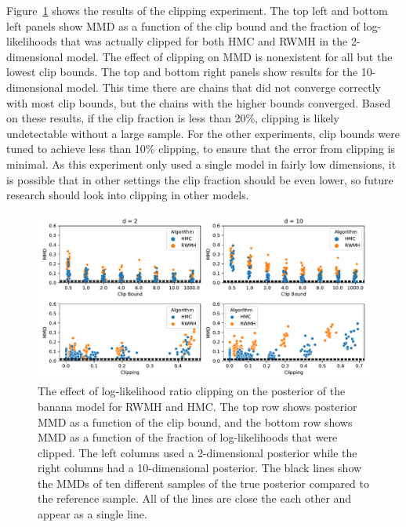 \documentclass[english,twoside,openright]{HYgraduMLDS}
\begin{document}
Figure~\ref{clip_effect_fig} shows the results of the clipping experiment.
The top left and bottom left panels show MMD as a function of the clip bound 
and the fraction of log-likelihoods that was actually clipped for both
HMC and RWMH in the 2-dimensional model. The effect of clipping on MMD 
is nonexistent for all but the lowest clip bounds. The top and bottom right 
panels show results for the 10-dimensional model. This time there are chains 
that did not converge correctly with most clip bounds, but the chains with 
the higher bounds converged. Based on these results, if the clip fraction is 
less than 20\%, clipping is likely undetectable without a large sample.
For the other experiments, clip bounds were tuned to achieve less than
10\% clipping, to ensure that the error from clipping is minimal.
As this experiment only used a single model in fairly low
dimensions, it is possible that in other settings the clip fraction should be
even lower, so future research should look into clipping in other models.

\begin{figure}[h]
    \centering
    \includegraphics[width=\textwidth]{figures/clipping.pdf}
    \caption{
        The effect of log-likelihood ratio clipping on the posterior of the
        banana model for RWMH and HMC.
        The top row shows posterior MMD as a function of the clip bound, and 
        the bottom row shows MMD as a function of the fraction of log-likelihoods
        that were clipped. The left columns used a 2-dimensional posterior 
        while the right columns had a 10-dimensional posterior. 
        The black lines show the MMDs of ten different samples of the true posterior
        compared to the reference sample. All of the lines are close the each 
        other and appear as a single line.
    }
    \label{clip_effect_fig}
\end{figure}
\end{document}
